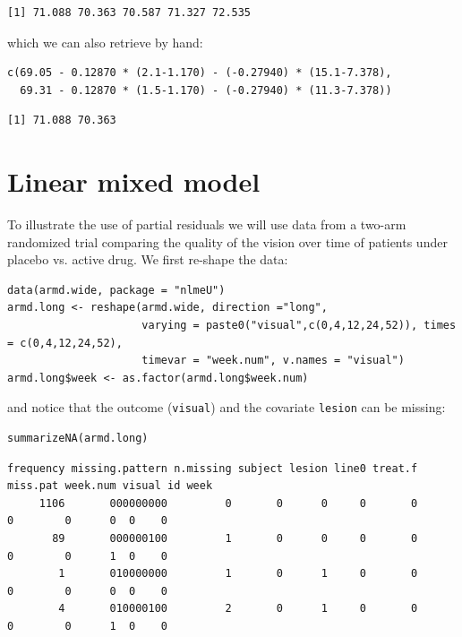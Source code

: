 \documentclass[12pt]{article}
\begin{document}
\begin{verbatim}
[1] 71.088 70.363 70.587 71.327 72.535
\end{verbatim}


which we can also retrieve by hand:
\lstset{language=r,label= ,caption= ,captionpos=b,numbers=none}
\begin{lstlisting}
c(69.05 - 0.12870 * (2.1-1.170) - (-0.27940) * (15.1-7.378),
  69.31 - 0.12870 * (1.5-1.170) - (-0.27940) * (11.3-7.378))
\end{lstlisting}

\begin{verbatim}
[1] 71.088 70.363
\end{verbatim}



\clearpage

\section{Linear mixed model}
\label{sec:org4dfd538}

To illustrate the use of partial residuals we will use data from a
two-arm randomized trial comparing the quality of the vision over time
of patients under placebo vs. active drug. We first re-shape the data:
\lstset{language=r,label= ,caption= ,captionpos=b,numbers=none}
\begin{lstlisting}
data(armd.wide, package = "nlmeU")
armd.long <- reshape(armd.wide, direction ="long",
                     varying = paste0("visual",c(0,4,12,24,52)), times = c(0,4,12,24,52),
                     timevar = "week.num", v.names = "visual")
armd.long$week <- as.factor(armd.long$week.num)
\end{lstlisting}

and notice that the outcome (\texttt{visual}) and the covariate \texttt{lesion} can be missing:
\lstset{language=r,label= ,caption= ,captionpos=b,numbers=none}
\begin{lstlisting}
summarizeNA(armd.long)
\end{lstlisting}

\begin{verbatim}
frequency missing.pattern n.missing subject lesion line0 treat.f miss.pat week.num visual id week
     1106       000000000         0       0      0     0       0        0        0      0  0    0
       89       000000100         1       0      0     0       0        0        0      1  0    0
        1       010000000         1       0      1     0       0        0        0      0  0    0
        4       010000100         2       0      1     0       0        0        0      1  0    0
\end{verbatim}
\end{document}

